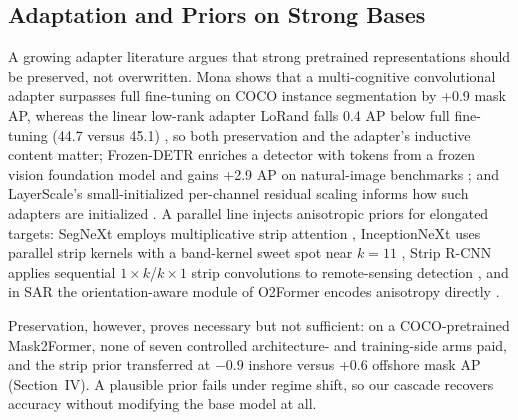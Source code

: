 \subsection{Adaptation and Priors on Strong Bases}
\label{sec:related-peft}
\label{sec:related-aniso}
A growing adapter literature argues that strong pretrained representations should be preserved, not overwritten. Mona shows that a multi-cognitive convolutional adapter surpasses full fine-tuning on COCO instance segmentation by +0.9 mask AP, whereas the linear low-rank adapter LoRand falls 0.4 AP below full fine-tuning (44.7 versus 45.1) \cite{mona2025}, so both preservation and the adapter's inductive content matter; Frozen-DETR enriches a detector with tokens from a frozen vision foundation model and gains +2.9 AP on natural-image benchmarks \cite{frozendetr2024}; and LayerScale's small-initialized per-channel residual scaling informs how such adapters are initialized \cite{cait2021}. A parallel line injects anisotropic priors for elongated targets: SegNeXt employs multiplicative strip attention \cite{segnext2022}, InceptionNeXt uses parallel strip kernels with a band-kernel sweet spot near $k=11$ \cite{inceptionnext2024}, Strip R-CNN applies sequential $1\times k$/$k\times 1$ strip convolutions to remote-sensing detection \cite{striprcnn2026}, and in SAR the orientation-aware module of O2Former encodes anisotropy directly \cite{o2former2025}.

Preservation, however, proves necessary but not sufficient: on a COCO-pretrained Mask2Former, none of seven controlled architecture- and training-side arms paid, and the strip prior transferred at $-0.9$ inshore versus +0.6 offshore mask AP (Section~IV). A plausible prior fails under regime shift, so our cascade recovers accuracy without modifying the base model at all.
